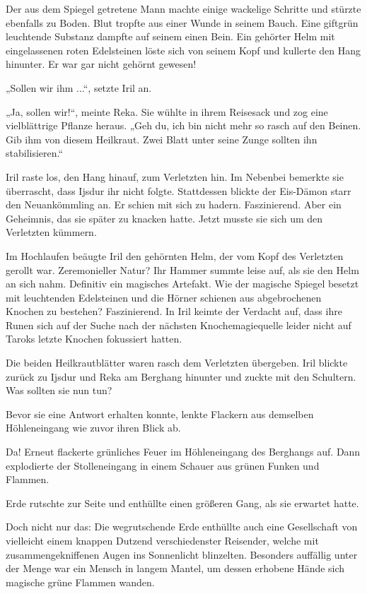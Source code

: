Der aus dem Spiegel getretene Mann machte einige wackelige Schritte und stürzte ebenfalls zu Boden. Blut tropfte aus einer Wunde in seinem Bauch. Eine giftgrün leuchtende Substanz dampfte auf seinem einen Bein. Ein gehörter Helm mit eingelassenen roten Edelsteinen löste sich von seinem Kopf und kullerte den Hang hinunter. Er war gar nicht gehörnt gewesen!

„Sollen wir ihm ...“, setzte Iril an.

„Ja, sollen wir!“, meinte Reka. Sie wühlte in ihrem Reisesack und zog eine vielblättrige Pflanze heraus. „Geh du, ich bin nicht mehr so rasch auf den Beinen. Gib ihm von diesem Heilkraut. Zwei Blatt unter seine Zunge sollten ihn stabilisieren.“

Iril raste los, den Hang hinauf, zum Verletzten hin. Im Nebenbei bemerkte sie überrascht, dass Ijsdur ihr nicht folgte. Stattdessen blickte der Eis-Dämon starr den Neuankömmling an. Er schien mit sich zu hadern. Faszinierend. Aber ein Geheimnis, das sie später zu knacken hatte. Jetzt musste sie sich um den Verletzten kümmern.

Im Hochlaufen beäugte Iril den gehörnten Helm, der vom Kopf des Verletzten gerollt war. Zeremonieller Natur? Ihr Hammer summte leise auf, als sie den Helm an sich nahm. Definitiv ein magisches Artefakt. Wie der magische Spiegel besetzt mit leuchtenden Edelsteinen und die Hörner schienen aus abgebrochenen Knochen zu bestehen? Faszinierend. In Iril keimte der Verdacht auf, dass ihre Runen sich auf der Suche nach der nächsten Knochemagiequelle leider nicht auf Taroks letzte Knochen fokussiert hatten.

Die beiden Heilkrautblätter waren rasch dem Verletzten übergeben. Iril blickte zurück zu Ijsdur und Reka am Berghang hinunter und zuckte mit den Schultern. Was sollten sie nun tun?

Bevor sie eine Antwort erhalten konnte, lenkte Flackern aus demselben Höhleneingang wie zuvor ihren Blick ab.

Da! Erneut flackerte grünliches Feuer im Höhleneingang des Berghangs auf. Dann explodierte der Stolleneingang in einem Schauer aus grünen Funken und Flammen.

Erde rutschte zur Seite und enthüllte einen größeren Gang, als sie erwartet hatte.

Doch nicht nur das: Die wegrutschende Erde enthüllte auch eine Gesellschaft von vielleicht einem knappen Dutzend verschiedenster Reisender, welche mit zusammengekniffenen Augen ins Sonnenlicht blinzelten. Besonders auffällig unter der Menge war ein Mensch in langem Mantel, um dessen erhobene Hände sich magische grüne Flammen wanden.

